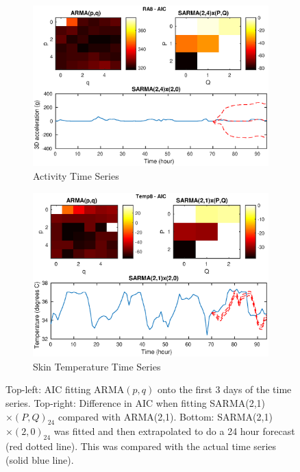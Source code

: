 \documentclass[a4paper]{proc}
\begin{document}
\begin{figure}[p]
    \begin{subfigure}[b]{\textwidth}
        \includegraphics[width=\textwidth]{aic_ra_8.eps}
        \caption{Activity Time Series}
    \end{subfigure}
    \begin{subfigure}[b]{\textwidth}
        \includegraphics[width=\textwidth]{aic_temp_8.eps}
        \caption{Skin Temperature Time Series}
    \end{subfigure}
    \caption{Top-left: AIC fitting ARMA$(p,q)$ onto the first 3 days of the time series. Top-right: Difference in AIC when fitting SARMA(2,1)$\times(P,Q)_{24}$ compared with ARMA(2,1). Bottom: SARMA(2,1)$\times(2,0)_{24}$ was fitted and then extrapolated to do a 24 hour forecast (red dotted line). This was compared with the actual time series (solid blue line).}
    \label{fig:sarmafit}
\end{figure}
\end{document}

